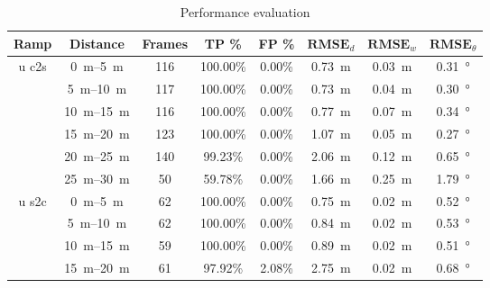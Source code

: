 \begin{table}[htbp]
    \centering
    \caption{Performance evaluation}
    \label{tab:eval_table_lidar}
    \begin{tabular}[t]{cccccccc}
        \toprule
        \textbf{Ramp}          & \textbf{Distance}        & \textbf{Frames} & \textbf{TP \%} & \textbf{FP \%} & $\textbf{RMSE}_d$  & $\textbf{RMSE}_w$ & $\textbf{RMSE}_\theta$ \\
        \midrule
        \multirow{6}{*}{u c2s} & \SIrange{0}{5}{\metre}   & 116             & 100.00\%       & 0.00\%         & \SI{0.73}{\metre}  & \SI{0.03}{\metre} & \SI{0.31}{\degree}     \\
                               & \SIrange{5}{10}{\metre}  & 117             & 100.00\%       & 0.00\%         & \SI{0.73}{\metre}  & \SI{0.04}{\metre} & \SI{0.30}{\degree}     \\
                               & \SIrange{10}{15}{\metre} & 116             & 100.00\%       & 0.00\%         & \SI{0.77}{\metre}  & \SI{0.07}{\metre} & \SI{0.34}{\degree}     \\
                               & \SIrange{15}{20}{\metre} & 123             & 100.00\%       & 0.00\%         & \SI{1.07}{\metre}  & \SI{0.05}{\metre} & \SI{0.27}{\degree}     \\
                               & \SIrange{20}{25}{\metre} & 140             & 99.23\%        & 0.00\%         & \SI{2.06}{\metre}  & \SI{0.12}{\metre} & \SI{0.65}{\degree}     \\
                               & \SIrange{25}{30}{\metre} & 50              & 59.78\%        & 0.00\%         & \SI{1.66}{\metre}  & \SI{0.25}{\metre} & \SI{1.79}{\degree}     \\
        \hline
        \multirow{6}{*}{u s2c} & \SIrange{0}{5}{\metre}   & 62              & 100.00\%       & 0.00\%         & \SI{0.75}{\metre}  & \SI{0.02}{\metre} & \SI{0.52}{\degree}     \\
                               & \SIrange{5}{10}{\metre}  & 62              & 100.00\%       & 0.00\%         & \SI{0.84}{\metre}  & \SI{0.02}{\metre} & \SI{0.53}{\degree}     \\
                               & \SIrange{10}{15}{\metre} & 59              & 100.00\%       & 0.00\%         & \SI{0.89}{\metre}  & \SI{0.02}{\metre} & \SI{0.51}{\degree}     \\
                               & \SIrange{15}{20}{\metre} & 61              & 97.92\%        & 2.08\%         & \SI{2.75}{\metre}  & \SI{0.02}{\metre} & \SI{0.68}{\degree}     \\

\end{tabular}
\end{table}
